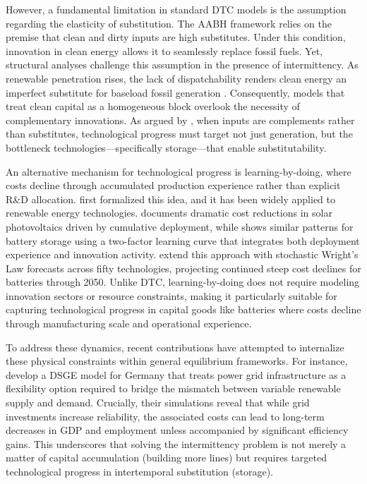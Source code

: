 \documentclass[12pt, a4paper]{article}
\begin{document}
However, a fundamental limitation in standard DTC models is the assumption regarding the elasticity of substitution. The AABH framework relies on the premise that clean and dirty inputs are high substitutes. Under this condition, innovation in clean energy allows it to seamlessly replace fossil fuels. Yet, structural analyses challenge this assumption in the presence of intermittency. As renewable penetration rises, the lack of dispatchability renders clean energy an imperfect substitute for baseload fossil generation \citep{hirth2013, joskow2011}. Consequently, models that treat clean capital as a homogeneous block overlook the necessity of complementary innovations. As argued by \citet{hart2019}, when inputs are complements rather than substitutes, technological progress must target not just generation, but the bottleneck technologies---specifically storage---that enable substitutability.

An alternative mechanism for technological progress is learning-by-doing, where costs decline through accumulated production experience rather than explicit R\&D allocation. \citet{arrow1962} first formalized this idea, and it has been widely applied to renewable energy technologies. \citet{nemet2006} documents dramatic cost reductions in solar photovoltaics driven by cumulative deployment, while \citet{kittner2017} shows similar patterns for battery storage using a two-factor learning curve that integrates both deployment experience and innovation activity. \citet{way2022} extend this approach with stochastic Wright's Law forecasts across fifty technologies, projecting continued steep cost declines for batteries through 2050. Unlike DTC, learning-by-doing does not require modeling innovation sectors or resource constraints, making it particularly suitable for capturing technological progress in capital goods like batteries where costs decline through manufacturing scale and operational experience.

To address these dynamics, recent contributions have attempted to internalize these physical constraints within general equilibrium frameworks. For instance, \citet{schreiner2020investing} develop a DSGE model for Germany that treats power grid infrastructure as a flexibility option required to bridge the mismatch between variable renewable supply and demand. Crucially, their simulations reveal that while grid investments increase reliability, the associated costs can lead to long-term decreases in GDP and employment unless accompanied by significant efficiency gains. This underscores that solving the intermittency problem is not merely a matter of capital accumulation (building more lines) but requires targeted technological progress in intertemporal substitution (storage).
\end{document}
